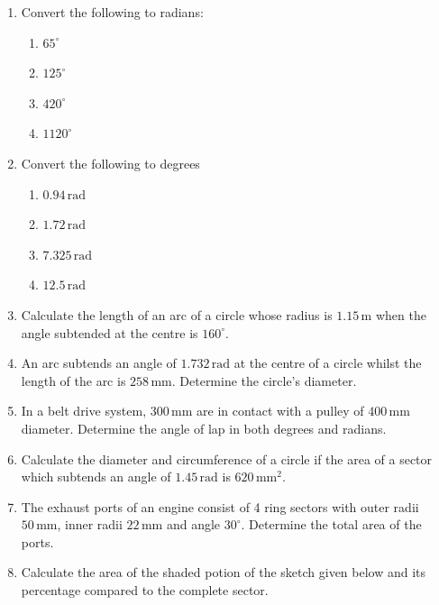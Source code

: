 \documentclass[
  12pt,
  oneside]{book}
\providecommand{\tightlist}{%
  \setlength{\itemsep}{0pt}\setlength{\parskip}{0pt}}
\theoremstyle{definition}
\theoremstyle{definition}
\theoremstyle{definition}
\theoremstyle{definition}
\theoremstyle{remark}
\begin{document}
\begin{enumerate}
\def\labelenumi{\arabic{enumi}.}
\item
  Convert the following to radians:

  \begin{enumerate}
  \def\labelenumii{\roman{enumii})}
  \tightlist
  \item
    \(65^\circ\)
  \item
    \(125^\circ\)
  \item
    \(420^\circ\)
  \item
    \(1120^\circ\)
  \end{enumerate}
\item
  Convert the following to degrees

  \begin{enumerate}
  \def\labelenumii{\roman{enumii})}
  \tightlist
  \item
    \(0.94\,\mathrm{rad}\)
  \item
    \(1.72\,\mathrm{rad}\)
  \item
    \(7.325\,\mathrm{rad}\)
  \item
    \(12.5\,\mathrm{rad}\)
  \end{enumerate}
\item
  Calculate the length of an arc of a circle whose radius is \(1.15\,\mathrm{m}\) when the angle subtended at the centre is \(160^\circ\).
\item
  An arc subtends an angle of \(1.732\,\mathrm{rad}\) at the centre of a circle whilst the length of the arc is \(258\,\mathrm{mm}\). Determine the circle's diameter.
\item
  In a belt drive system, \(300\,\mathrm{mm}\) are in contact with a pulley of \(400\,\mathrm{mm}\) diameter. Determine the angle of lap in both degrees and radians.
\item
  Calculate the diameter and circumference of a circle if the area of a sector which subtends an angle of \(1.45\,\mathrm{rad}\) is \(620\,\mathrm{mm}^2\).
\item
  The exhaust ports of an engine consist of 4 ring sectors with outer radii \(50\,\mathrm{mm}\), inner radii \(22\,\mathrm{mm}\) and angle \(30^\circ\). Determine the total area of the ports.
\item
  Calculate the area of the shaded potion of the sketch given below and its percentage compared to the complete sector.
\end{enumerate}
\end{document}
